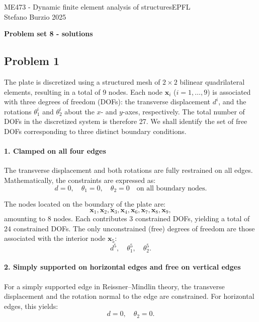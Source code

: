 \documentclass[12pt]{article}
\begin{document}
\noindent ME473 - Dynamic finite element analysis of structures\hfill EPFL\\
Stefano Burzio \hfill 2025\\
\vspace{0.3cm}

\hspace*{\fill}\textbf{\Large Problem set 8 - solutions}\hspace*{\fill}

\hrulefill

\subsection*{Problem 1}
The plate is discretized using a structured mesh of \(2 \times 2\) bilinear quadrilateral elements, resulting in a total of 9 nodes. Each node \(\mathbf{x}_i\) (\(i = 1, \dots, 9\)) is associated with three degrees of freedom (DOFs): the transverse displacement \(d^i\), and the rotations \(\theta_1^i\) and \(\theta_2^i\) about the \(x\)- and \(y\)-axes, respectively. The total number of DOFs in the discretized system is therefore 27. We shall identify the set of free DOFs corresponding to three distinct boundary conditions.

\paragraph*{1. Clamped on all four edges}
The transverse displacement and both rotations are fully restrained on all edges. Mathematically, the constraints are expressed as:
\[
    d = 0, \quad \theta_1 = 0, \quad \theta_2 = 0 \quad \text{on all boundary nodes}.
\]

The nodes located on the boundary of the plate are:
\[
    \mathbf{x}_1, \mathbf{x}_2, \mathbf{x}_3, \mathbf{x}_4, \mathbf{x}_6, \mathbf{x}_7, \mathbf{x}_8, \mathbf{x}_9,
\]
amounting to 8 nodes. Each contributes 3 constrained DOFs, yielding a total of \(24\) constrained DOFs. The only unconstrained (free) degrees of freedom are those associated with the interior node \(\mathbf{x}_5\):
\[
    d^5, \quad \theta_1^5, \quad \theta_2^5.
\]

\paragraph*{2. Simply supported on horizontal edges and free on vertical edges} For a simply supported edge in Reissner--Mindlin theory, the transverse displacement and the rotation normal to the edge are constrained. For horizontal edges, this yields:
\[
    d = 0, \quad \theta_2 = 0.
\]
\end{document}
